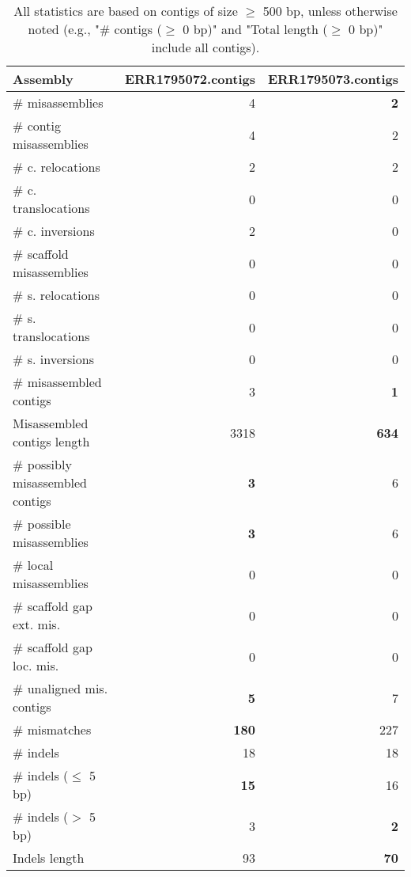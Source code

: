 \documentclass[12pt,a4paper]{article}
\begin{document}
\begin{table}[ht]
\begin{center}
\caption{All statistics are based on contigs of size $\geq$ 500 bp, unless otherwise noted (e.g., "\# contigs ($\geq$ 0 bp)" and "Total length ($\geq$ 0 bp)" include all contigs).}
\begin{tabular}{|l*{2}{|r}|}
\hline
Assembly & ERR1795072.contigs & ERR1795073.contigs \\ \hline
\# misassemblies & 4 & {\bf 2} \\ \hline
\hspace{2mm}\# contig misassemblies & 4 & 2 \\ \hline
\hspace{5mm}\# c. relocations & 2 & 2 \\ \hline
\hspace{5mm}\# c. translocations & 0 & 0 \\ \hline
\hspace{5mm}\# c. inversions & 2 & 0 \\ \hline
\hspace{2mm}\# scaffold misassemblies & 0 & 0 \\ \hline
\hspace{5mm}\# s. relocations & 0 & 0 \\ \hline
\hspace{5mm}\# s. translocations & 0 & 0 \\ \hline
\hspace{5mm}\# s. inversions & 0 & 0 \\ \hline
\# misassembled contigs & 3 & {\bf 1} \\ \hline
Misassembled contigs length & 3318 & {\bf 634} \\ \hline
\# possibly misassembled contigs & {\bf 3} & 6 \\ \hline
\hspace{5mm}\# possible misassemblies & {\bf 3} & 6 \\ \hline
\# local misassemblies & 0 & 0 \\ \hline
\# scaffold gap ext. mis. & 0 & 0 \\ \hline
\# scaffold gap loc. mis. & 0 & 0 \\ \hline
\# unaligned mis. contigs & {\bf 5} & 7 \\ \hline
\# mismatches & {\bf 180} & 227 \\ \hline
\# indels & 18 & 18 \\ \hline
\hspace{5mm}\# indels ($\leq$ 5 bp) & {\bf 15} & 16 \\ \hline
\hspace{5mm}\# indels ($>$ 5 bp) & 3 & {\bf 2} \\ \hline
Indels length & 93 & {\bf 70} \\ \hline
\end{tabular}
\end{center}
\end{table}
\end{document}
